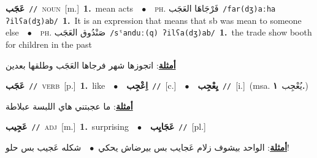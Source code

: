 \documentclass[10pt,a4paper,twoside]{article} %
\begin{document}
\begin{multicols}{2}
{\setlength\topsep{0pt}\textbf{\foreignlanguage{arabic}{عَجَب}}\ {\color{gray}\texttt{//}\color{black}}\ \textsc{noun}\ [m.]\ \textbf{1.}~mean acts\ \ $\bullet$\ \ \textsc{ph.} \color{gray} \foreignlanguage{arabic}{فَرْجَاهَا العَجَب}\color{black}\ {\color{gray}\texttt{/{\sffamily far(dʒ)aːha ʔilʕa(dʒ)ab}/}\color{black}}\ \textbf{1.}~It is an expression that means that sb was mean to someone else\ \ $\bullet$\ \ \textsc{ph.} \color{gray} \foreignlanguage{arabic}{صَنْدُوق العَجَب}\color{black}\ {\color{gray}\texttt{/{\sffamily sˤanduː(q) ʔilʕa(dʒ)ab}/}\color{black}}\ \textbf{1.}~the trade show booth for children in the past\  \begin{flushright}\color{gray}\foreignlanguage{arabic}{\textbf{\underline{\foreignlanguage{arabic}{أمثلة}}}: اتجوزها شهر فرجاها العَجَب وطلقها بعدين}\end{flushright}\color{black}} \vspace{2mm}

{\setlength\topsep{0pt}\textbf{\foreignlanguage{arabic}{عَجَب}}\ {\color{gray}\texttt{//}\color{black}}\ \textsc{verb}\ [p.]\ \textbf{1.}~like\ \ $\bullet$\ \ \setlength\topsep{0pt}\textbf{\foreignlanguage{arabic}{اِعْجِب}}\ {\color{gray}\texttt{//}\color{black}}\ [c.]\ \ $\bullet$\ \ \setlength\topsep{0pt}\textbf{\foreignlanguage{arabic}{يِعْجِب}}\ {\color{gray}\texttt{//}\color{black}}\ [i.]\ \color{gray}(msa. \foreignlanguage{arabic}{يُعْجِب}~\foreignlanguage{arabic}{\textbf{١.}})\color{black}\  \begin{flushright}\color{gray}\foreignlanguage{arabic}{\textbf{\underline{\foreignlanguage{arabic}{أمثلة}}}: ما عجبتني هاي اللبسة عبلاطة}\end{flushright}\color{black}} \vspace{2mm}

{\setlength\topsep{0pt}\textbf{\foreignlanguage{arabic}{عَجِيب}}\ {\color{gray}\texttt{//}\color{black}}\ \textsc{adj}\ [m.]\ \textbf{1.}~surprising\ \ $\bullet$\ \ \setlength\topsep{0pt}\textbf{\foreignlanguage{arabic}{عَجَايِب}}\ {\color{gray}\texttt{//}\color{black}}\ [pl.]\  \begin{flushright}\color{gray}\foreignlanguage{arabic}{\textbf{\underline{\foreignlanguage{arabic}{أمثلة}}}: الواحد بيشوف زلام عَجايب بس بيرضاش يحكي\ $\bullet$\ \  شكله عَجيب بس حلو!}\end{flushright}\color{black}} \vspace{2mm}


\end{multicols}
\end{document}
